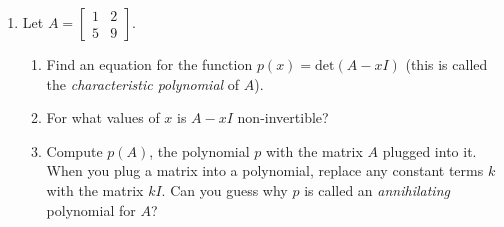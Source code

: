 \documentclass[letter]{article}
\newcommand{\Det}{\mathrm{det}}
\newcommand{\mat}[1]{\begin{bmatrix}#1\end{bmatrix}}
\begin{document}
\begin{enumerate}
		\item Let $A=\mat{1&2\\5&9}$.
		\begin{enumerate}
			\item Find an equation for the function $p(x)=\Det(A-xI)$ (this is called the
				\emph{characteristic polynomial} of $A$).
			\item For what values of $x$ is $A-xI$ non-invertible?
			\item Compute $p(A)$, the polynomial $p$ with the matrix $A$ plugged into it.  When you plug a matrix
				into a polynomial, replace any constant terms $k$ with the matrix $kI$.
				Can you guess
				why $p$ is called an \emph{annihilating} polynomial for $A$?
		\end{enumerate}

	\end{enumerate}
\end{document}
